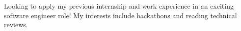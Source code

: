 

\begin{cvparagraph}
Looking to apply my previous internship and work experience in an exciting software engineer role! My interests include hackathons and reading technical reviews.
\end{cvparagraph}
